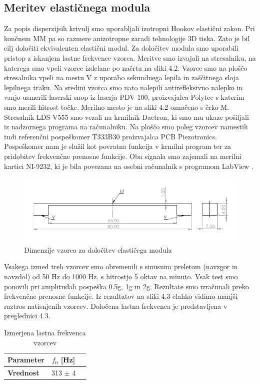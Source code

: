 \documentclass[12pt]{report}
\begin{document}
\subsection{Meritev elastičnega modula}
Za popis disperzijsih krivulj smo uporabljali izotropni Hookov elastični zakon. Pri končnem \ac{MM} pa so razmere anizotropne zaradi tehnologije 3D tiska. Zato je bil cilj določiti ekvivalenten 
elastični modul. Za določitev modula smo uporabili pristop z iskanjem lastne frekvence vzorca. Meritve smo izvajali na stresalniku, na katerega smo vpeli vzorce izdelane po načrtu na sliki 4.2. Vzorce smo na 
ploščo stresalnika vpeli na mestu V z uporabo sekundnega lepila in zaščitnega sloja lepilnega traku. Na sredini vzorca smo nato nalepili antirefleksivno nalepko in vanjo usmerili laserski snop iz laserja PDV 100, proizvajalca
Polytec s katerim smo merili hitrost točke. Merilno mesto je na sliki 4.2 označeno s črko M. Stresalnik LDS V555 smo vezali na krmilnik Dactron, ki smo mu ukaze pošiljali iz nadzornega programa na računalniku. Na ploščo smo poleg vzorcev namestili tudi 
referenčni pospeškomer T333B30 proizvajalca PCB Piezotronics. Pospeškomer nam je služil kot povratna funkcija v krmilni program ter za pridobitev frekvenčne prenosne funkcije. Oba signala smo zajemali na merilni kartici NI-9232, ki je bila povezana
na osebni računalnik s programom LabView \cite{labview}.
\\
\begin{figure}[H]
  \centering
  \includegraphics[scale=0.9]{Images/tester.png}
  \caption{Dimenzije vzorca za določitev elastičega modula}
\end{figure}
Vsakega izmed treh vzorcev smo obremenili s sinusnim preletom (navzgor in navzdol) od 50 Hz do 1000 Hz, s hitrostjo 5 oktav na minuto. Vsak test smo ponovili pri amplitudah pospeška 0.5g, 1g in 2g. Rezultate smo izračunali preko frekvenčne
prenosne funkcije. Iz rezultatov na sliki 4.3 elahko vidimo manjši raztros natisnjenih vzorcev. Določena lastna frekvenca je predstavljena v preglednici 4.3.
\begin{table}[H]
  \caption{Izmerjena lastna frekvenca vzorcev}
  \centering
  \begin{tabular}{ | l | c | r | }
    \hline
    \textbf{Parameter} & $f_0$ [Hz] \\ \hline
    \textbf{Vrednost} & 313 $\pm$ 4 \\
    \hline  
  \end{tabular}
\end{table}
\end{document}
